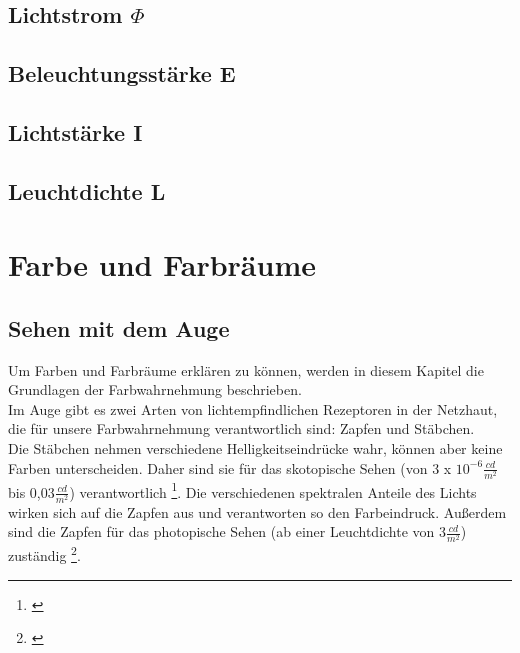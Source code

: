 \section{Lichtstrom $\Phi$} \label{sec_lumen}

\section{Beleuchtungsstärke E}\label{sec_lux}

\section{Lichtstärke I}\label{sec_candela}

\section{Leuchtdichte L}\label{sec_candelamm}

\chapter{Farbe und Farbräume}

\section{Sehen mit dem Auge} \label{sec_auge}
Um Farben und Farbräume erklären zu können, werden in diesem Kapitel die Grundlagen der Farbwahrnehmung beschrieben.\\
Im Auge gibt es zwei Arten von lichtempfindlichen Rezeptoren in der Netzhaut, die für unsere Farbwahrnehmung verantwortlich sind: Zapfen und Stäbchen.\\
Die Stäbchen nehmen verschiedene Helligkeitseindrücke wahr, können aber keine Farben unterscheiden. Daher sind sie für das skotopische Sehen (von 3 x $10^{-6} \frac{cd}{m^{2}}$ bis 0,03$\frac{cd}{m^{2}}$) verantwortlich \footnote{\cite{doccheck sko}}.
Die verschiedenen spektralen Anteile des Lichts wirken sich auf die Zapfen aus und verantworten so den Farbeindruck. Außerdem sind die Zapfen für das photopische Sehen (ab einer Leuchtdichte von 3$\frac{cd}{m^{2}}$) zuständig \footnote{\cite{doccheck pho}}.
  



